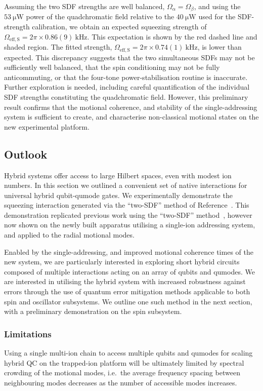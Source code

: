     Assuming the two SDF strengths are well balanced, $\Omega_\alpha=\Omega_\beta$, and using the $53~\unit{\micro\watt}$ power of the quadchromatic field relative to the $40~\unit{\micro\watt}$ used for the SDF-strength calibration, we obtain an expected squeezing strength of $\Omega_\mathrm{eff,S}=2\pi\times0.86(9)~\unit{\kilo\hertz}$. This expectation is shown by the red dashed line and shaded region.
    The fitted strength, $\Omega_\mathrm{eff,S}=2\pi\times0.74(1)~\unit{\kilo\hertz}$, is lower than expected. This discrepancy suggests that the two simultaneous SDFs may not be sufficiently well balanced, that the spin conditioning may not be fully anticommuting, or that the four-tone power-stabilisation routine is inaccurate.
    Further exploration is needed, including careful quantification of the individual SDF strengths constituting the quadchromatic field. 
    However, this preliminary result confirms that the motional coherence, and stability of the single-addressing system is sufficient to create, and characterise non-classical motional states on the new experimental platform.

\subsection{Outlook}
    Hybrid systems offer access to large Hilbert spaces, even with modest ion numbers.
    In this section we outlined a convenient set of native interactions for universal hybrid qubit-qumode gates. We experimentally demonstrate the squeezing interaction generated via the ``two-SDF'' method of
    Reference~\cite{sutherland_universal_2021}. This demonstration replicated previous work using the ``two-SDF'' method~\cite{bazavan_squeezing_2026}, however now shown on the newly built apparatus utilising a single-ion addressing system, and applied to the radial motional modes.\

    Enabled by the single-addressing, and improved motional coherence times of
    the new system, we are particularly interested in exploring short hybrid
    circuits composed of multiple interactions acting on an array of qubits and
    qumodes. We are interested in utilising the hybrid system with
    increased robustness against errors through the use of quantum error mitigation methods applicable to both 
    spin and oscillator subsystems. We outline one such method in the next section, with a preliminary demonstration on the spin subsystem.

    \subsubsection{Limitations}
    Using a single multi-ion chain to access multiple qubits and qumodes for
    scaling hybrid QC on the trapped-ion platform will be ultimately limited by
    spectral crowding of the motional modes, i.e.~the average frequency spacing
    between neighbouring modes decreases as the number of accessible modes
    increases\cite{james_quantum_1998, schwerdt_scalable_2024}. 

